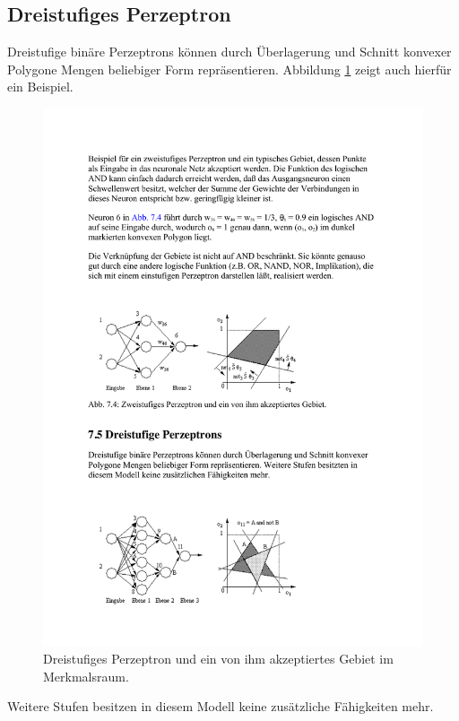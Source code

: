 \subsection*{Dreistufiges Perzeptron}
Dreistufige binäre Perzeptrons können durch Überlagerung und Schnitt konvexer Polygone Mengen beliebiger Form repräsentieren. Abbildung \ref{fig:perzeptron-dreistufig} zeigt auch hierfür ein Beispiel.

\begin{figure}[ht!] \centering 
	\includegraphics[width=\linewidth]{figures/ch02_perzeptron-dreistufig.pdf}
	\caption{Dreistufiges Perzeptron und ein von ihm akzeptiertes Gebiet im Merkmalsraum.}
	\label{fig:perzeptron-dreistufig}
\end{figure}

Weitere Stufen besitzen in diesem Modell keine zusätzliche Fähigkeiten mehr.



